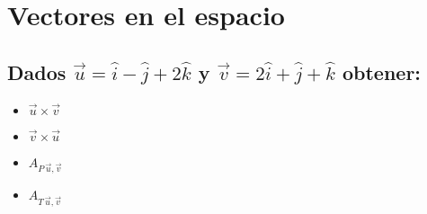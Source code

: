 \documentclass[letterpaper, 12pt]{article}
\begin{document}
\setcounter{page}{1}
\thispagestyle{fancy}
\section{Vectores en el espacio}
\subsection*{Dados \(\vec{u}=\hat{i}-\hat{j}+2\hat{k}\) y \(\vec{v}=2\hat{i}+\hat{j}+\hat{k}\) obtener:}
\begin{itemize}
    \item \(\vec{u}\times \vec{v}\)
    \item \(\vec{v}\times \vec{u}\)
    \item \(A_{P\,\vec{u},\vec{v}}\)
    \item \(A_{T\,\vec{u},\vec{v}}\)
\end{itemize}
\end{document}
